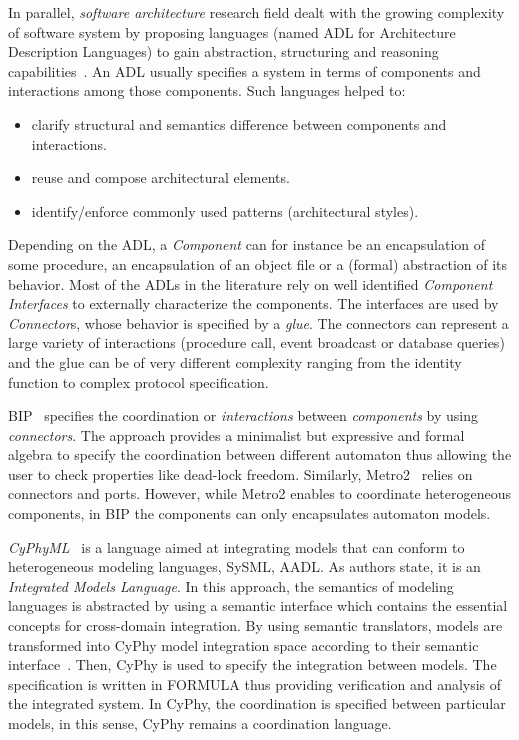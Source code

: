 In parallel, \emph{software architecture} research field dealt with the growing complexity of software system by proposing languages (named ADL for Architecture Description Languages) to gain abstraction, structuring and reasoning capabilities~\cite{rapidebib,wrightbib,uniconbib,frameadlsbib,garlansoftarchbib}. An ADL usually specifies a system in terms of components and interactions among those components. Such languages helped to:
\begin{itemize}
	\item clarify structural and semantics difference between components and interactions.
	\item reuse and compose architectural elements.
	\item identify/enforce commonly used patterns (\eg architectural styles).
\end{itemize}

Depending on the ADL, a \emph{Component} can for instance be an encapsulation of some procedure, an encapsulation of an object file or a (formal) abstraction of its behavior. Most of the ADLs in the literature rely on well identified \emph{Component Interfaces} to externally characterize the components. The interfaces are used by \emph{Connector}s, whose behavior is specified by a \emph{glue}. The connectors can represent a large variety of interactions (\eg procedure call, event broadcast or database queries) and the glue can be of very different complexity ranging from the identity function to complex protocol specification. 
			 

BIP~\cite{bipbib} specifies the coordination or \emph{interactions} between \emph{components} by using \emph{connectors}. The approach provides a minimalist but expressive and formal algebra to specify the coordination between different automaton thus allowing the user to check properties like dead-lock freedom. Similarly, Metro2~\cite{metro2bib} relies on connectors and ports. However, while Metro2 enables to coordinate heterogeneous components, in BIP the components can only encapsulates automaton models. 
			 
			 
\emph{CyPhyML}~\cite{semanicbackplane} is a language aimed at integrating models that can conform to heterogeneous modeling languages, \eg SySML, AADL. As authors state, it is an \emph{Integrated Models Language}. In this approach, the semantics of modeling languages is abstracted by using a semantic interface which contains the essential concepts for cross-domain integration. By using semantic translators, models are transformed into CyPhy model integration space according to their semantic interface~\cite{semanicbackplane}. Then, CyPhy is used to specify the integration between models. The specification is written in FORMULA thus providing verification and analysis of the integrated system. In CyPhy, the coordination is specified between particular models, in this sense, CyPhy remains a coordination language.
			 
